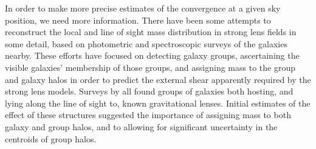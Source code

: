 \documentclass[useAMS,usenatbib]{mn2e}
\begin{document}
In order to make more precise estimates of the convergence at a given
sky position, we need more information.   There have been some attempts
to reconstruct the local and line of sight mass distribution in strong
lens fields in some detail, based on photometric and spectroscopic
surveys of the galaxies nearby. These efforts have focused on  detecting
galaxy groups, ascertaining the visible galaxies' membership of those
groups, and assigning mass to the group and galaxy halos in order to
predict the external shear apparently required by the strong lens
models. Surveys by
\citet{Fassnacht+Lubin2002,AugerEtal2007,WilliamsEtal2006,MomchevaEtal2006}
all found groups of galaxies both hosting, and lying  along the line of
sight to, known gravitational lenses. Initial estimates of the effect of
these structures suggested the importance of assigning mass to both
galaxy and group halos, and to allowing for significant uncertainty in
the centroids of group halos. 
\end{document}
